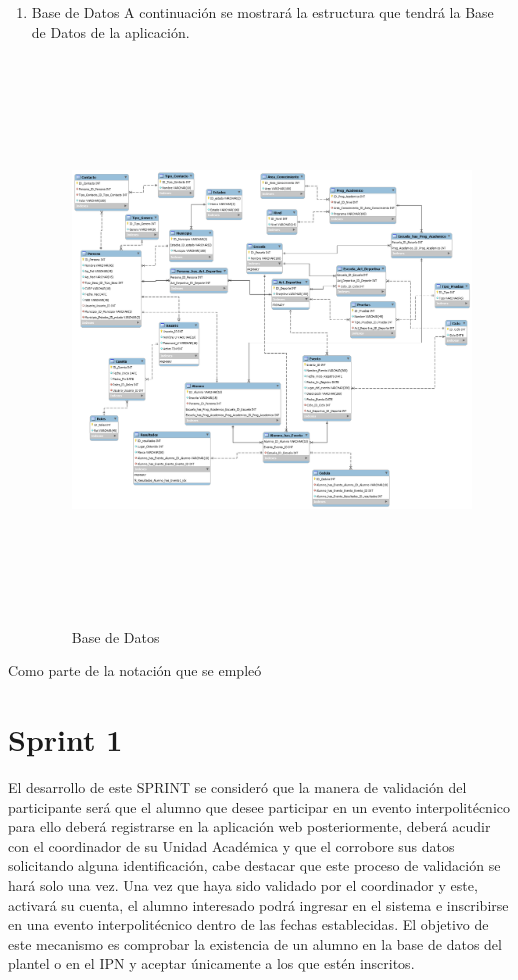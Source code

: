	\begin{enumerate}
		\item Base de Datos
		A continuación se mostrará la estructura que tendrá la Base de Datos de la aplicación.
		\begin{figure}[hbt!]
			\centering
			\includegraphics[width=22cm, height=15cm, angle=90]{Imagenes/BasedeDatos.png}
			\caption{Base de Datos}
		\end{figure}
	\end{enumerate}
	\pagebreak
	
	Como parte de la notación que se empleó 
	
	\section{Sprint 1}
	El desarrollo de este SPRINT se consideró que la manera de validación del participante será que el alumno que desee participar en un evento interpolitécnico para ello deberá registrarse en la aplicación web posteriormente, deberá acudir con el coordinador de su Unidad Académica y que el corrobore sus datos solicitando alguna identificación, cabe destacar que este proceso de validación se hará solo una vez.
	Una vez que haya sido validado por el coordinador y este, activará su cuenta, el alumno interesado podrá ingresar en el sistema e inscribirse en una evento interpolitécnico dentro de las fechas establecidas.
	El objetivo de este mecanismo es comprobar la existencia de un alumno en la base de datos del plantel o en el IPN y aceptar únicamente a los que estén inscritos.
	

